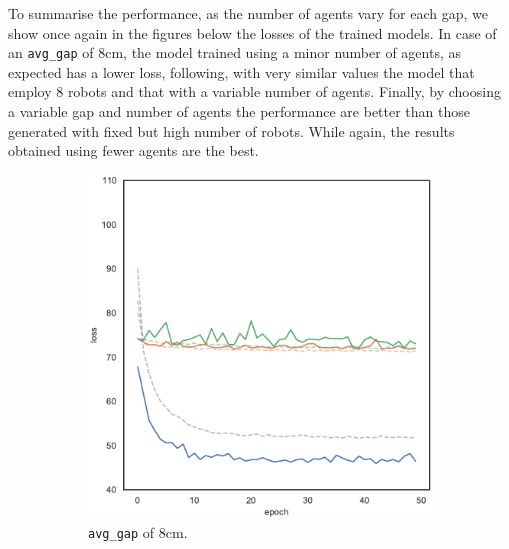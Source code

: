 \bigskip
To summarise the performance, as the number of agents vary for each gap, we 
show once again in the figures below the losses of the trained models.
In case of an \texttt{avg\_gap} of $8$\gls{cm}, the model trained using 
a minor number of agents, as expected has a lower loss, following, with very 
similar values the model that employ 8 robots and that with a variable number of 
agents.
Finally, by choosing a variable gap and number of agents the performance are 
better than those generated with fixed but high number of robots. While again, 
the results obtained using fewer agents are the best.
\begin{figure}[!htb]
	\centering
	\begin{subfigure}[h]{0.3\textwidth}
		\centering
		\includegraphics[width=\textwidth]{contents/images/task1-extension/loss-distributed-gap_8@copy}%
		\caption{\texttt{avg\_gap} of $8$\gls{cm}.}
	\end{subfigure}
	\hfill
	\begin{subfigure}[h]{0.3\textwidth}
		\centering

\end{subfigure}
\end{figure}
